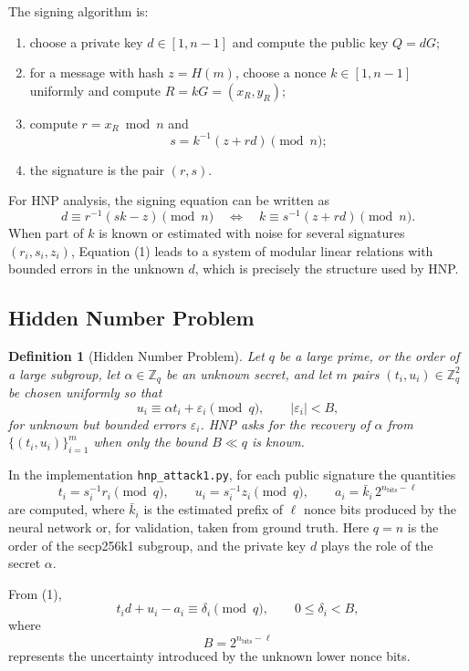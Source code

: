 \documentclass[11pt,a4paper]{article}
\newtheorem{definition}[theorem]{Definition}
\begin{document}
The signing algorithm is:
\begin{enumerate}[label=(\arabic*),leftmargin=2.5em]
\item choose a private key $d\in[1,n-1]$ and compute the public key $Q=dG$;
\item for a message with hash $z=H(m)$, choose a nonce $k\in[1,n-1]$ uniformly and compute $R=kG=(x_R,y_R)$;
\item compute $r=x_R\bmod n$ and
\[
s=k^{-1}(z+rd)\pmod n;
\]
\item the signature is the pair $(r,s)$.
\end{enumerate}

For HNP analysis, the signing equation can be written as
\[
d\equiv r^{-1}(sk-z)\pmod n
\quad\Longleftrightarrow\quad
k\equiv s^{-1}(z+rd)\pmod n.
\tag{1}
\]
When part of $k$ is known or estimated with noise for several signatures $(r_i,s_i,z_i)$, Equation (1) leads to a system of modular linear relations with bounded errors in the unknown $d$, which is precisely the structure used by HNP.

\subsection{Hidden Number Problem}

\begin{definition}[Hidden Number Problem]
Let $q$ be a large prime, or the order of a large subgroup, let $\alpha\in\mathbb Z_q$ be an unknown secret, and let $m$ pairs $(t_i,u_i)\in\mathbb Z_q^2$ be chosen uniformly so that
\[
u_i\equiv \alpha t_i+\varepsilon_i\pmod q,
\qquad
|\varepsilon_i|<B,
\]
for unknown but bounded errors $\varepsilon_i$. HNP asks for the recovery of $\alpha$ from $\{(t_i,u_i)\}_{i=1}^m$ when only the bound $B\ll q$ is known.
\end{definition}

In the implementation \texttt{hnp\_attack1.py}, for each public signature the quantities
\[
t_i=s_i^{-1}r_i\pmod q,
\qquad
u_i=s_i^{-1}z_i\pmod q,
\qquad
a_i=\bar{k}_i\,2^{n_{\mathrm{bits}}-\ell}
\]
are computed, where $\bar{k}_i$ is the estimated prefix of $\ell$ nonce bits produced by the neural network or, for validation, taken from ground truth. Here $q=n$ is the order of the secp256k1 subgroup, and the private key $d$ plays the role of the secret $\alpha$.

From (1),
\[
t_i d+u_i-a_i\equiv\delta_i\pmod q,
\qquad
0\leq\delta_i<B,
\]
where
\[
B=2^{n_{\mathrm{bits}}-\ell}
\]
represents the uncertainty introduced by the unknown lower nonce bits.
\end{document}
